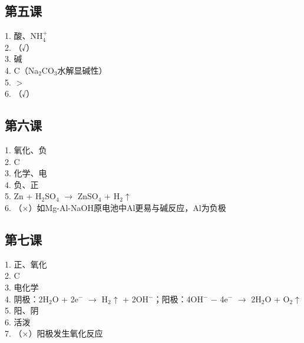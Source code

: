 \documentclass[a4paper,12pt]{ctexart}
\begin{document}
\subsection*{第五课}
1. 酸、NH$_4^+$\\
2. （√）\\
3. 碱\\
4. C（Na$_2$CO$_3$水解显碱性）\\
5. $>$\\
6. （√）

\subsection*{第六课}
1. 氧化、负\\
2. C\\
3. 化学、电\\
4. 负、正\\
5. Zn + H$_2$SO$_4$ $\rightarrow$ ZnSO$_4$ + H$_2$$\uparrow$\\
6. （×）如Mg-Al-NaOH原电池中Al更易与碱反应，Al为负极

\subsection*{第七课}
1. 正、氧化\\
2. C\\
3. 电化学\\
4. 阴极：2H$_2$O + 2e$^-$ $\rightarrow$ H$_2$$\uparrow$ + 2OH$^-$；阳极：4OH$^-$ $-$ 4e$^-$ $\rightarrow$ 2H$_2$O + O$_2$$\uparrow$\\
5. 阳、阴\\
6. 活泼\\
7. （×）阳极发生氧化反应
\end{document}
